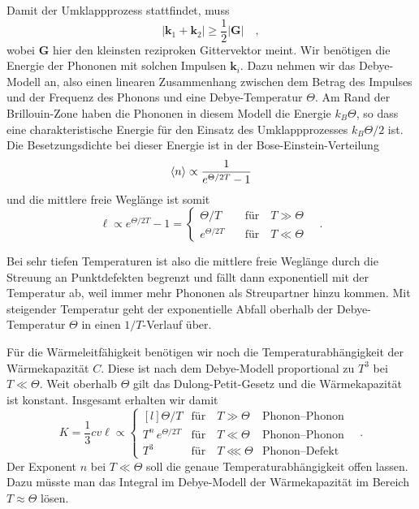 Damit der Umklappprozess stattfindet, muss
\begin{equation}
    | \mathbf{k}_1 +  \mathbf{k}_2| \ge \frac{1}{2} | \mathbf{G} | \quad ,
\end{equation}
wobei $\mathbf{G}$ hier den kleinsten reziproken Gittervektor meint. Wir benötigen die Energie der Phononen mit solchen Impulsen $\mathbf{k}_i$. Dazu nehmen wir das Debye-Modell an, also einen linearen Zusammenhang zwischen dem Betrag des Impulses und der Frequenz des Phonons und eine Debye-Temperatur $\Theta$.  Am Rand der Brillouin-Zone haben die Phononen in diesem Modell die Energie $k_B \Theta$, so dass eine charakteristische Energie für den Einsatz des Umklappprozesses $k_B \Theta / 2$ ist. Die Besetzungsdichte bei dieser Energie ist in der Bose-Einstein-Verteilung
\begin{equation}
    \braket{n} \propto \frac{1}{e^{\Theta / 2T} -1}
\end{equation}
und die mittlere freie Weglänge ist somit
\begin{equation}
    \ell \propto e^{\Theta / 2T} -1 = 
    \left\{
    \begin{matrix*}
        \Theta / T             & \text{für} \quad T \gg \Theta  \\     
        e^{\Theta / 2T} \quad & \text{für} \quad T \ll \Theta 
    \end{matrix*}
    \right. \quad .
\end{equation}

Bei sehr tiefen Temperaturen ist also die mittlere freie Weglänge durch die Streuung an Punktdefekten begrenzt und fällt dann exponentiell mit der Temperatur ab, weil immer mehr Phononen als Streupartner hinzu kommen. Mit steigender Temperatur geht der exponentielle Abfall oberhalb der Debye-Temperatur $\Theta$ in einen $1/T$-Verlauf über.


Für die Wärmeleitfähigkeit benötigen wir noch die Temperaturabhängigkeit der Wärmekapazität $C$. Diese ist nach dem Debye-Modell proportional zu $T^3$ bei $T \ll \Theta$. Weit oberhalb $\Theta$ gilt das Dulong-Petit-Gesetz und die Wärmekapazität ist konstant. Insgesamt erhalten wir damit 
\begin{equation}
    K = \frac{1}{3} c v \ell  \propto 
    \left\{
    \begin{matrix*}[l]
        \Theta / T                    & \text{für} \quad T \gg \Theta    & \text{Phonon--Phonon}      \\
      T^n \,  e^{\Theta / 2T}        & \text{für} \quad T \ll \Theta    & \text{Phonon--Phonon}      \\
      T^3                            & \text{für} \quad T \lll \Theta   & \text{Phonon--Defekt}     
    \end{matrix*}
    \right. \quad .
\end{equation}
Der Exponent $n$ bei $ T \ll \Theta  $ soll die genaue Temperaturabhängigkeit offen lassen. Dazu müsste man das Integral im Debye-Modell der Wärmekapazität im Bereich $T \approx \Theta$ lösen. 

